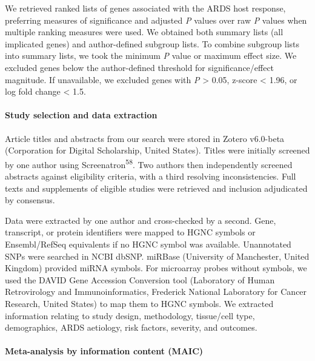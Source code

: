 \documentclass[
  11,
  a4paper,
]{article}
\let\oldparagraph\paragraph
\renewcommand{\paragraph}[1]{\oldparagraph{#1}\mbox{}}
\begin{document}
We retrieved ranked lists of genes associated with the ARDS host
response, preferring measures of significance and adjusted \emph{P}
values over raw \emph{P} values when multiple ranking measures were
used. We obtained both summary lists (all implicated genes) and
author-defined subgroup lists. To combine subgroup lists into summary
lists, we took the minimum \emph{P} value or maximum effect size. We
excluded genes below the author-defined threshold for
significance/effect magnitude. If unavailable, we excluded genes with
\emph{P} \textgreater{} 0.05, z-score \textless{} 1.96, or log fold
change \textless{} 1.5.

\hypertarget{study-selection-and-data-extraction}{%
\paragraph{Study selection and data
extraction}\label{study-selection-and-data-extraction}}

Article titles and abstracts from our search were stored in Zotero
v6.0-beta (Corporation for Digital Scholarship, United States). Titles
were initially screened by one author using
Screenatron\textsuperscript{58}. Two authors then independently screened
abstracts against eligibility criteria, with a third resolving
inconsistencies. Full texts and supplements of eligible studies were
retrieved and inclusion adjudicated by consensus.

Data were extracted by one author and cross-checked by a second. Gene,
transcript, or protein identifiers were mapped to HGNC symbols or
Ensembl/RefSeq equivalents if no HGNC symbol was available. Unannotated
SNPs were searched in NCBI dbSNP. miRBase (University of Manchester,
United Kingdom) provided miRNA symbols. For microarray probes without
symbols, we used the DAVID Gene Accession Conversion tool (Laboratory of
Human Retrovirology and Immunoinformatics, Frederick National Laboratory
for Cancer Research, United States) to map them to HGNC symbols. We
extracted information relating to study design, methodology, tissue/cell
type, demographics, ARDS aetiology, risk factors, severity, and
outcomes.

\hypertarget{meta-analysis-by-information-content-maic-1}{%
\paragraph{Meta-analysis by information content
(MAIC)}\label{meta-analysis-by-information-content-maic-1}}
\end{document}
